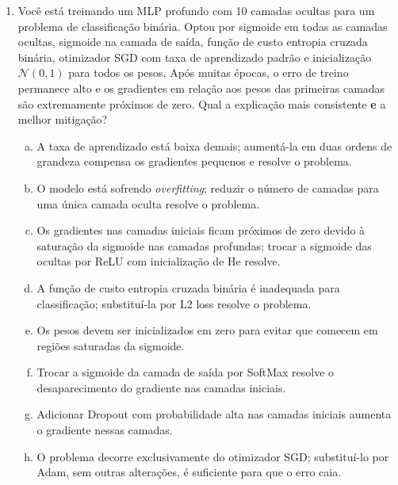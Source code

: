 \documentclass{dlproblemset}
\begin{document}
\begin{enumerate}[1)]
    \item Você está treinando um MLP profundo com 10 camadas ocultas para um problema de classificação binária. Optou por sigmoide em todas as camadas ocultas, sigmoide na camada de saída, função de custo entropia cruzada binária, otimizador SGD com taxa de aprendizado padrão e inicialização $\mathcal{N}(0, 1)$ para todos os pesos. Após muitas épocas, o erro de treino permanece alto e os gradientes em relação aos pesos das primeiras camadas são extremamente próximos de zero. Qual a explicação mais consistente \textbf{e} a melhor mitigação?
    \begin{enumerate}[(a)]
        \item A taxa de aprendizado está baixa demais; aumentá-la em duas ordens de grandeza compensa os gradientes pequenos e resolve o problema.
        \item O modelo está sofrendo \textit{overfitting}; reduzir o número de camadas para uma única camada oculta resolve o problema.
        \item Os gradientes nas camadas iniciais ficam próximos de zero devido à saturação da sigmoide nas camadas profundas; trocar a sigmoide das ocultas por ReLU com inicialização de He resolve.
        \item A função de custo entropia cruzada binária é inadequada para classificação; substituí-la por L2 loss resolve o problema.
        \item Os pesos devem ser inicializados em zero para evitar que comecem em regiões saturadas da sigmoide.
        \item Trocar a sigmoide da camada de saída por SoftMax resolve o desaparecimento do gradiente nas camadas iniciais.
        \item Adicionar Dropout com probabilidade alta nas camadas iniciais aumenta o gradiente nessas camadas.
        \item O problema decorre exclusivamente do otimizador SGD; substituí-lo por Adam, sem outras alterações, é suficiente para que o erro caia.
    \end{enumerate}


\end{enumerate}
\end{document}
